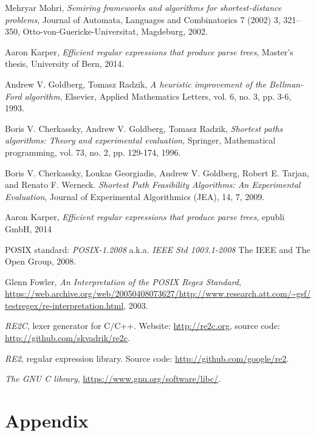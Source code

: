 \documentclass[AMA,STIX1COL]{WileyNJD-v2}
\begin{document}
\begin{thebibliography}{99}
    Mehryar Mohri,
    \textit{Semiring frameworks and algorithms for shortest-distance problems},
    Journal of Automata, Languages and Combinatorics 7 (2002) 3, 321–350, Otto-von-Guericke-Universitat, Magdeburg,
    2002.

    Aaron Karper,
    \textit{Efficient regular expressions that produce parse trees},
    Master's thesis,
    University of Bern,
    2014.

    Andrew V. Goldberg, Tomasz Radzik,
    \textit{A heuristic improvement of the Bellman-Ford algorithm},
    Elsevier, Applied Mathematics Letters, vol. 6, no. 3, pp. 3-6,
    1993.

    Boris V. Cherkassky, Andrew V. Goldberg, Tomasz Radzik,
    \textit{Shortest paths algorithms: Theory and experimental evaluation},
    Springer, Mathematical programming, vol. 73, no. 2, pp. 129-174,
    1996.

    Boris V. Cherkassky, Loukas Georgiadis, Andrew V. Goldberg, Robert E. Tarjan, and Renato F. Werneck.
    \textit{Shortest Path Feasibility Algorithms: An Experimental Evaluation},
    Journal of Experimental Algorithmics (JEA), 14, 7,
    2009.

    Aaron Karper,
    \textit{Efficient regular expressions that produce parse trees},
    epubli GmbH,
    2014

    POSIX standard: \textit{POSIX-1.2008}
    a.k.a. \textit{IEEE Std 1003.1-2008}
    The IEEE and The Open Group,
    2008.

    Glenn Fowler,
    \textit{An Interpretation of the POSIX Regex Standard},
    \url{https://web.archive.org/web/20050408073627/http://www.research.att.com/~gsf/testregex/re-interpretation.html},
    2003.

    \textit{RE2C}, lexer generator for C/C++.
    Website: \url{http://re2c.org},
    source code: \url{http://github.com/skvadrik/re2c}.

    \textit{RE2}, regular expression library.
    Source code: \url{http://github.com/google/re2}.

    \textit{The GNU C library},
    \url{https://www.gnu.org/software/libc/}.

\end{thebibliography}


\vfill\null
\clearpage


\section*{Appendix}
\end{document}
